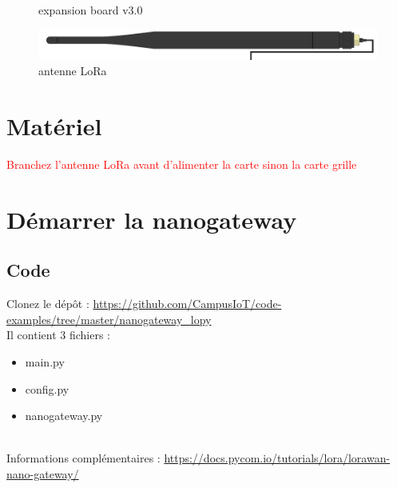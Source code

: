 \documentclass{article}
\begin{document}
\begin{figure}[H]
\begin{minipage}[b]{0.4\textwidth}
    \caption{expansion board v3.0}
  \end{minipage}
\end{figure}

    \begin{figure}[H]
\begin{center}
\advance\leftskip-3cm
\advance\rightskip-3cm
\includegraphics[keepaspectratio=true,scale=0.2]{lora_antenna.png}
\caption{antenne LoRa}
\label{visina8}
\end{center}\end{figure}



\section{Matériel}
\textcolor{red}{Branchez l'antenne LoRa avant d'alimenter la carte sinon la carte grille}\\

\section{Démarrer la nanogateway}
\subsection{Code}

Clonez le dépôt : \url{https://github.com/CampusIoT/code-examples/tree/master/nanogateway_lopy}\\
Il contient 3 fichiers :
\begin{itemize}
    \item main.py
    \item config.py
    \item nanogateway.py
\end{itemize}\\


Informations complémentaires : \url{https://docs.pycom.io/tutorials/lora/lorawan-nano-gateway/} 
\end{document}
